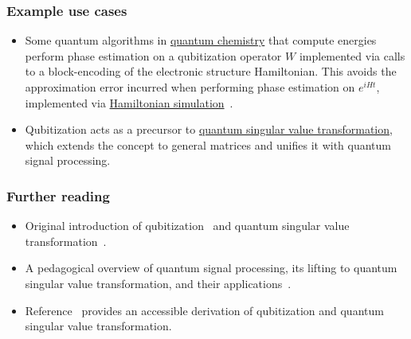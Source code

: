 \begin{refsection}

\subsubsection*{Example use cases}

\begin{itemize}
    \item Some quantum algorithms in \hyperref[appl:ElectronicStructure]{quantum chemistry} that compute energies perform phase estimation on a qubitization operator $W$ implemented via calls to a block-encoding of the electronic structure Hamiltonian. This avoids the approximation error incurred when performing phase estimation on $e^{iHt}$, implemented via \hyperref[prim:HamiltonianSimulation]{Hamiltonian simulation}~\cite{poulin2018SpectralQubitization,berry2018ImprovedEigenstatesFermionic}.
    \item Qubitization acts as a precursor to \hyperref[prim:QSVT]{quantum singular value transformation}, which extends the concept to general matrices and unifies it with quantum signal processing.
\end{itemize}


\subsubsection*{Further reading}

\begin{itemize}
    \item Original introduction of qubitization~\cite{low2016HamSimQubitization} and quantum singular value transformation~\cite{gilyen2018QSingValTransf}.
    \item A pedagogical overview of quantum signal processing, its lifting to quantum singular value transformation, and their applications~\cite{martyn2021GrandUnificationQAlgs}.
    \item Reference~\cite[Chapters 7 \& 8]{lin2022LectureNotes} provides an accessible derivation of qubitization and quantum singular value transformation.
\end{itemize}

\printbibliography[heading=secbib,segment=\therefsegment]

\end{refsection}

